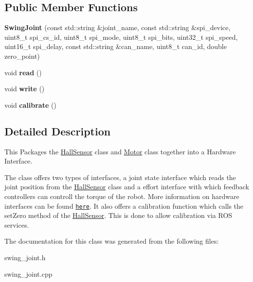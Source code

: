 \subsection*{Public Member Functions}
\begin{DoxyCompactItemize}
\item 
\mbox{\label{classSwingJoint_a9ddb518c4aff708a5b96290001af7a11}} 
{\bfseries Swing\+Joint} (const std\+::string \&joint\+\_\+name, const std\+::string \&spi\+\_\+device, uint8\+\_\+t spi\+\_\+cs\+\_\+id, uint8\+\_\+t spi\+\_\+mode, uint8\+\_\+t spi\+\_\+bits, uint32\+\_\+t spi\+\_\+speed, uint16\+\_\+t spi\+\_\+delay, const std\+::string \&can\+\_\+name, uint8\+\_\+t can\+\_\+id, double zero\+\_\+point)
\item 
\mbox{\label{classSwingJoint_a3f966fc71b37d8e5c34e2ddc5ec79e03}} 
void {\bfseries read} ()
\item 
\mbox{\label{classSwingJoint_aa2d54c4712616e04e36af2db528384ab}} 
void {\bfseries write} ()
\item 
\mbox{\label{classSwingJoint_acbdd7fae2441b423d146240322c1f848}} 
void {\bfseries calibrate} ()
\end{DoxyCompactItemize}


\subsection{Detailed Description}
This Packages the \hyperlink{classHallSensor}{Hall\+Sensor} class and \hyperlink{classMotor}{Motor} class together into a Hardware Interface. 

The class offers two types of interfaces, a joint state interface which reads the joint position from the \hyperlink{classHallSensor}{Hall\+Sensor} class and a effort interface with which feedback controllers can controll the torque of the robot. More information on hardware interfaces can be found \href{http://wiki.ros.org/ros_control#Hardware_Interfaces}{\tt here}. It also offers a calibration function which calls the set\+Zero method of the \hyperlink{classHallSensor}{Hall\+Sensor}. This is done to allow calibration via R\+OS services. 

The documentation for this class was generated from the following files\+:\begin{DoxyCompactItemize}
\item 
swing\+\_\+joint.\+h\item 
swing\+\_\+joint.\+cpp\end{DoxyCompactItemize}
